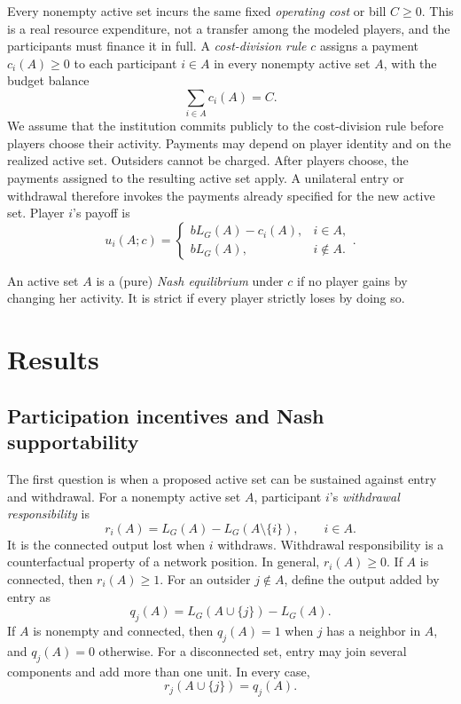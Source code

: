 \documentclass[preprint,12pt,authoryear]{elsarticle}
\newcommand{\LCC}{L}
\begin{document}
Every nonempty active set incurs the same fixed \emph{operating cost} or bill
\(C\geq0\). This is a real resource expenditure, not a transfer among the
modeled players, and the participants must finance it in full. A
\emph{cost-division rule} \(c\) assigns a payment \(c_i(A)\geq0\) to each
participant \(i\in A\) in every nonempty active set \(A\), with the budget balance
\[
 \sum_{i\in A}c_i(A)=C.
\]
We assume that the institution commits publicly to the cost-division rule before players choose
their activity. Payments may depend on player identity and on the realized
active set. Outsiders cannot be charged. After players choose, the payments
assigned to the resulting active set apply. A unilateral entry or withdrawal
therefore invokes the payments already specified for the new active set.
Player \(i\)'s payoff is
\[
 u_i(A;c)=
 \begin{cases}
  b\LCC_G(A)-c_i(A),&i\in A,\\
  b\LCC_G(A),&i\notin A.
 \end{cases}.
\]

An active set \(A\) is a (pure) \emph{Nash equilibrium} under \(c\) if no
player gains by changing her activity. It is strict if every player strictly
loses by doing so.  


\section{Results}
\label{sec:nash-supportability}

\subsection{Participation incentives and Nash supportability}
\label{subsec:capacity}

The first question is when a proposed active set can be sustained against entry
and withdrawal. For a nonempty active set \(A\), participant \(i\)'s
\emph{withdrawal responsibility} is
\[
 r_i(A)=\LCC_G(A)-\LCC_G(A\setminus\{i\}),
 \qquad i\in A.
\]
It is the connected output lost when \(i\) withdraws. Withdrawal responsibility
is a counterfactual property of a network position. In general, \(r_i(A)\geq0\). If \(A\) is connected,
then \(r_i(A)\geq1\). For an outsider
\(j\notin A\), define the output added by entry as
\[
 q_j(A)=\LCC_G(A\cup\{j\})-\LCC_G(A).
\]
If \(A\) is nonempty and connected, then \(q_j(A)=1\) when \(j\) has a
neighbor in \(A\), and \(q_j(A)=0\) otherwise. For a disconnected set, entry
may join several components and add more than one unit. In every case,
\[
 r_j(A\cup\{j\})=q_j(A).
\]
\end{document}
